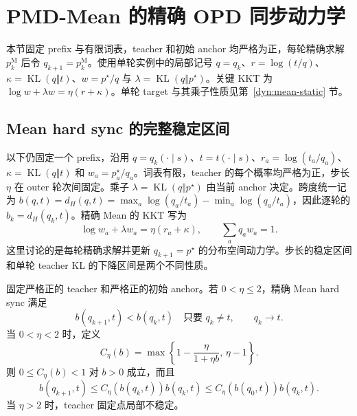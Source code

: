 \documentclass[lang=cn,scheme=chinese,openany]{../book/elegantbook}
\newcommand{\KL}{\operatorname{KL}}
\begin{document}


\section{PMD-Mean 的精确 OPD 同步动力学}
\label{dyn:mean-dynamics}

本节固定 prefix 与有限词表，teacher 和初始 anchor 均严格为正，每轮精确求解 $p_k^{\mathrm M}$ 后令 $q_{k+1}=p_k^{\mathrm M}$。使用单轮实例中的局部记号 $q=q_k$、$r=\log(t/q)$、$\kappa=\KL(q\Vert t)$、$w=p^\star/q$ 与 $\lambda=\KL(q\Vert p^\star)$。关键 KKT 为 $\log w+\lambda w=\eta(r+\kappa)$。单轮 target 与其乘子性质见第~\ref{dyn:mean-static} 节。

\subsection{Mean hard sync 的完整稳定区间}
\label{dyn:sec:mean-hard-sync-stability}

以下仍固定一个 prefix，沿用 $q=q_k(\cdot\mid s)$、$t=t(\cdot\mid s)$、$r_a=\log(t_a/q_a)$、$\kappa=\KL(q\Vert t)$ 和 $w_a=p_a^\star/q_a$。词表有限，teacher 的每个概率均严格为正，步长 $\eta$ 在 outer 轮次间固定。乘子 $\lambda=\KL(q\Vert p^\star)$ 由当前 anchor 决定。跨度统一记为 $b(q,t)=d_H(q,t)=\max_a\log(q_a/t_a)-\min_a\log(q_a/t_a)$，因此逐轮的 $b_k=d_H(q_k,t)$。精确 Mean 的 KKT 写为
\begin{equation}
 \log w_a+\lambda w_a=\eta(r_a+\kappa),
 \qquad \sum_aq_aw_a=1.
 \label{dyn:eq:mean-hard-sync-kkt}
\end{equation}
这里讨论的是每轮精确求解并更新 $q_{k+1}=p^\star$ 的分布空间动力学。步长的稳定区间和单轮 teacher KL 的下降区间是两个不同性质。

\begin{theorem}
\label{dyn:thm:mean-hard-sync-full-stability}
固定严格正的 teacher 和严格正的初始 anchor。若 $0<\eta\le2$，精确 Mean hard sync 满足
\begin{equation*}
 b(q_{k+1},t)<b(q_k,t)
 \quad\text{只要 }q_k\ne t,
 \qquad q_k\longrightarrow t.
\end{equation*}
当 $0<\eta<2$ 时，定义
\begin{equation}
 C_\eta(b)=\max\left\{1-\frac{\eta}{1+\eta b},\,\eta-1\right\}.
 \label{dyn:eq:mean-hard-sync-contraction-factor}
\end{equation}
则 $0\le C_\eta(b)<1$ 对 $b>0$ 成立，而且
\begin{equation}
 b(q_{k+1},t)\le C_\eta(b(q_k,t))b(q_k,t)
 \le C_\eta(b(q_0,t))b(q_k,t).
 \label{dyn:eq:mean-hard-sync-stability-geometric}
\end{equation}
当 $\eta>2$ 时，teacher 固定点局部不稳定。
\end{theorem}
\end{document}
